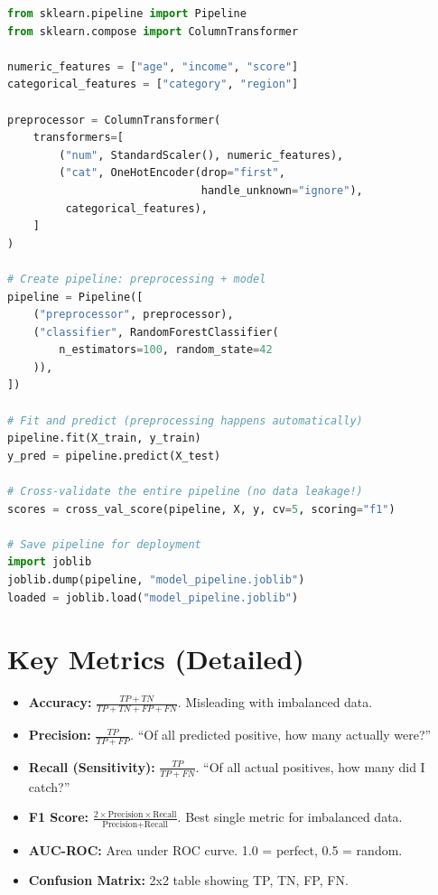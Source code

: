 \documentclass[12pt, a4paper, oneside]{book}
\begin{document}
\begin{lstlisting}[language=Python, caption={Production ML pipeline}]
from sklearn.pipeline import Pipeline
from sklearn.compose import ColumnTransformer

numeric_features = ["age", "income", "score"]
categorical_features = ["category", "region"]

preprocessor = ColumnTransformer(
    transformers=[
        ("num", StandardScaler(), numeric_features),
        ("cat", OneHotEncoder(drop="first",
                              handle_unknown="ignore"),
         categorical_features),
    ]
)

# Create pipeline: preprocessing + model
pipeline = Pipeline([
    ("preprocessor", preprocessor),
    ("classifier", RandomForestClassifier(
        n_estimators=100, random_state=42
    )),
])

# Fit and predict (preprocessing happens automatically)
pipeline.fit(X_train, y_train)
y_pred = pipeline.predict(X_test)

# Cross-validate the entire pipeline (no data leakage!)
scores = cross_val_score(pipeline, X, y, cv=5, scoring="f1")

# Save pipeline for deployment
import joblib
joblib.dump(pipeline, "model_pipeline.joblib")
loaded = joblib.load("model_pipeline.joblib")
\end{lstlisting}

\section{Key Metrics (Detailed)}

\begin{itemize}[leftmargin=2em]
    \item \textbf{Accuracy:} $\frac{TP + TN}{TP + TN + FP + FN}$. Misleading with imbalanced data.
    \item \textbf{Precision:} $\frac{TP}{TP + FP}$. ``Of all predicted positive, how many actually were?''
    \item \textbf{Recall (Sensitivity):} $\frac{TP}{TP + FN}$. ``Of all actual positives, how many did I catch?''
    \item \textbf{F1 Score:} $\frac{2 \times \text{Precision} \times \text{Recall}}{\text{Precision} + \text{Recall}}$. Best single metric for imbalanced data.
    \item \textbf{AUC-ROC:} Area under ROC curve. 1.0 = perfect, 0.5 = random.
    \item \textbf{Confusion Matrix:} 2x2 table showing TP, TN, FP, FN.
\end{itemize}
\end{document}
